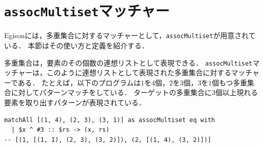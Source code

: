 \section{\texttt{assocMultiset}マッチャー}\label{matcher-assoc}

Egisonには，多重集合に対するマッチャーとして，\lstinline{assocMultiset}が用意されている．
本節はその使い方と定義を紹介する．

多重集合は，要素のその個数の連想リストとして表現できる．
\lstinline{assocMultiset}マッチャーは，このように連想リストとして表現された多重集合に対するマッチャーである．
たとえば，以下のプログラムは$1$を$4$個，$2$を$3$個，$3$を$1$個もつ多重集合に対してパターンマッチをしている．
ターゲットの多重集合に$3$個以上現れる要素を取り出すパターンが表現されている．
\begin{lstlisting}[language=egison]
matchAll [(1, 4), (2, 3), (3, 1)] as assocMultiset eq with
  | $x ^ #3 :: $rs -> (x, rs)
-- [(1, [(1, 1), (2, 3), (3, 2)]), (2, [(1, 4), (3, 2)])]
\end{lstlisting}
